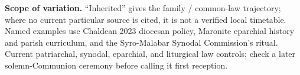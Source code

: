 \begin{landscape}
{\textbf{Scope of variation.} ``Inherited'' gives the family / common-law trajectory; where no current particular source is cited, it is not a verified local timetable. Named examples use Chaldean 2023 diocesan policy, Maronite eparchial history and parish curriculum, and the Syro-Malabar Synodal Commission's ritual. Current patriarchal, synodal, eparchial, and liturgical law controls; check a later solemn-Communion ceremony before calling it first reception.
}
\end{landscape}
